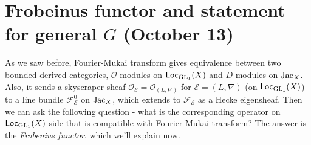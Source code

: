 \newpage
\section{Frobeinus functor and statement for general $G$ (October 13)}

As we saw before, Fourier-Mukai transform gives equivalence between two bounded derived categories, $\mathcal{O}$-modules on 
$\operatorname{\mathsf{Loc}}_{\operatorname{\mathrm{GL}}_1}(X)$ and $D$-modules on $\operatorname{\mathrm{Jac}}_X$.
Also, it sends a skyscraper sheaf $\mathcal{O}_{\mathcal{E}} =\mathcal{O}_{(L, \nabla)}$ for $\mathcal{E} = (L, \nabla)$ (on $\operatorname{\mathsf{Loc}}_{\operatorname{\mathrm{GL}}_1}(X)$) to a line bundle $\mathcal{F}_{\mathcal{E}}^{0}$ on $\operatorname{\mathrm{Jac}}_X$,
which extends to $\mathcal{F}_{\mathcal{E}}$ as a Hecke eigensheaf.
Then we can ask the following question - what is the corresponding operator on $\operatorname{\mathsf{Loc}}_{\operatorname{\mathrm{GL}}_1}(X)$-side that is compatible with Fourier-Mukai transform?
The answer is the \emph{Frobenius functor}, which we'll explain now.

